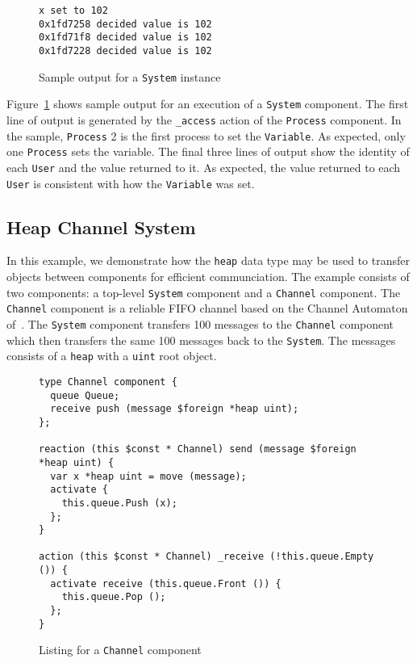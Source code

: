 \begin{figure}
\begin{verbatim}
x set to 102
0x1fd7258 decided value is 102
0x1fd71f8 decided value is 102
0x1fd7228 decided value is 102
\end{verbatim}
\cprotect\caption{Sample output for a \verb+System+ instance}
\label{system_output}
\end{figure}

Figure~\ref{system_output} shows sample output for an execution of a \verb+System+ component.
The first line of output is generated by the \verb+_access+ action of the \verb+Process+ component.
In the sample, \verb+Process+ 2 is the first process to set the \verb+Variable+.
As expected, only one \verb+Process+ sets the variable.
The final three lines of output show the identity of each \verb+User+ and the value returned to it.
As expected, the value returned to each \verb+User+ is consistent with how the \verb+Variable+ was set.

\subsection{Heap Channel System}

In this example, we demonstrate how the \verb+heap+ data type may be used to transfer objects between components for efficient communciation.
The example consists of two components:  a top-level \verb+System+ component and a \verb+Channel+ component.
The \verb+Channel+ component is a reliable FIFO channel based on the Channel Automaton of~\cite{nancy1996distributed}.
The \verb+System+ component transfers 100 messages to the \verb+Channel+ component which then transfers the same 100 messages back to the \verb+System+.
The messages consists of a \verb+heap+ with a \verb+uint+ root object.

\begin{figure}
\begin{verbatim}
type Channel component {
  queue Queue;
  receive push (message $foreign *heap uint);
};

reaction (this $const * Channel) send (message $foreign *heap uint) {
  var x *heap uint = move (message);
  activate {
    this.queue.Push (x);
  };
}

action (this $const * Channel) _receive (!this.queue.Empty ()) {
  activate receive (this.queue.Front ()) {
    this.queue.Pop ();
  };
}
\end{verbatim}
\cprotect\caption{Listing for a \verb+Channel+ component}
\label{channel_listing}
\end{figure}

